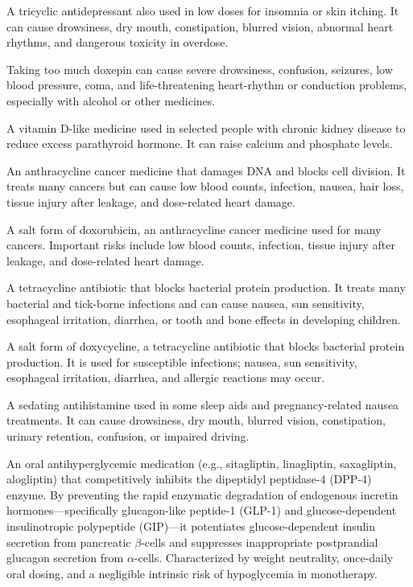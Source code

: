  A tricyclic antidepressant also used in low doses for insomnia or skin itching. It can cause drowsiness, dry mouth, constipation, blurred vision, abnormal heart rhythms, and dangerous toxicity in overdose.

 Taking too much doxepin can cause severe drowsiness, confusion, seizures, low blood pressure, coma, and life-threatening heart-rhythm or conduction problems, especially with alcohol or other medicines.

 A vitamin D-like medicine used in selected people with chronic kidney disease to reduce excess parathyroid hormone. It can raise calcium and phosphate levels.

 An anthracycline cancer medicine that damages DNA and blocks cell division. It treats many cancers but can cause low blood counts, infection, nausea, hair loss, tissue injury after leakage, and dose-related heart damage.

 A salt form of doxorubicin, an anthracycline cancer medicine used for many cancers. Important risks include low blood counts, infection, tissue injury after leakage, and dose-related heart damage.

 A tetracycline antibiotic that blocks bacterial protein production. It treats many bacterial and tick-borne infections and can cause nausea, sun sensitivity, esophageal irritation, diarrhea, or tooth and bone effects in developing children.

 A salt form of doxycycline, a tetracycline antibiotic that blocks bacterial protein production. It is used for susceptible infections; nausea, sun sensitivity, esophageal irritation, diarrhea, and allergic reactions may occur.

 A sedating antihistamine used in some sleep aids and pregnancy-related nausea treatments. It can cause drowsiness, dry mouth, blurred vision, constipation, urinary retention, confusion, or impaired driving.

 An oral antihyperglycemic medication (e.g., sitagliptin, linagliptin, saxagliptin, alogliptin) that competitively inhibits the dipeptidyl peptidase-4 (DPP-4) enzyme. By preventing the rapid enzymatic degradation of endogenous incretin hormones—specifically glucagon-like peptide-1 (GLP-1) and glucose-dependent insulinotropic polypeptide (GIP)—it potentiates glucose-dependent insulin secretion from pancreatic $\beta$-cells and suppresses inappropriate postprandial glucagon secretion from $\alpha$-cells. Characterized by weight neutrality, once-daily oral dosing, and a negligible intrinsic risk of hypoglycemia in monotherapy.

